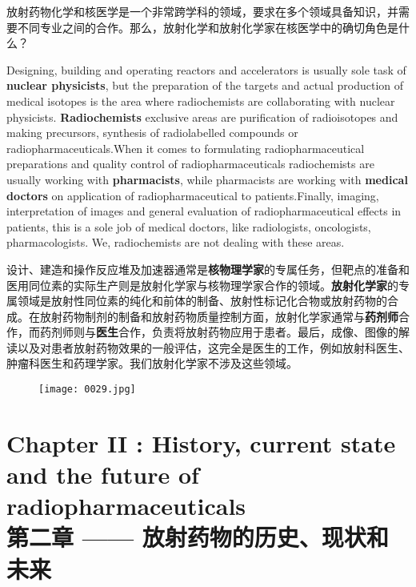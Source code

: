 \documentclass[dvipsnames, svgnames,a4paper,11pt]{article}
\begin{document}
放射药物化学和核医学是一个非常跨学科的领域，要求在多个领域具备知识，并需要不同专业之间的合作。那么，放射化学和放射化学家在核医学中的确切角色是什么？

Designing, building and operating reactors and accelerators is usually sole task of \textbf{nuclear physicists}, but the preparation of the targets and actual production of medical isotopes is the area where radiochemists are collaborating with nuclear physicists. \textbf{Radiochemists} exclusive areas are purification of radioisotopes and making precursors, synthesis of radiolabelled compounds or radiopharmaceuticals.When it comes to formulating radiopharmaceutical preparations and quality control of radiopharmaceuticals radiochemists are usually working with \textbf{pharmacists}, while pharmacists are working with \textbf{medical doctors} on application of radiopharmaceutical to patients.Finally, imaging, interpretation of images and general evaluation of radiopharmaceutical effects in patients, this is a sole job of medical doctors, like radiologists, oncologists, pharmacologists. We, radiochemists are not dealing with these areas.

设计、建造和操作反应堆及加速器通常是\textbf{核物理学家}的专属任务，但靶点的准备和医用同位素的实际生产则是放射化学家与核物理学家合作的领域。\textbf{放射化学家}的专属领域是放射性同位素的纯化和前体的制备、放射性标记化合物或放射药物的合成。在放射药物制剂的制备和放射药物质量控制方面，放射化学家通常与\textbf{药剂师}合作，而药剂师则与\textbf{医生}合作，负责将放射药物应用于患者。最后，成像、图像的解读以及对患者放射药物效果的一般评估，这完全是医生的工作，例如放射科医生、肿瘤科医生和药理学家。我们放射化学家不涉及这些领域。

\begin{figure}[htbp]
      \centering
      \texttt{[image: 0029.jpg]}
       \label{fig15}
\end{figure}

\newpage

\section{Chapter II : History, current state and the future of radiopharmaceuticals\\第二章 —— 放射药物的历史、现状和未来}
\end{document}
